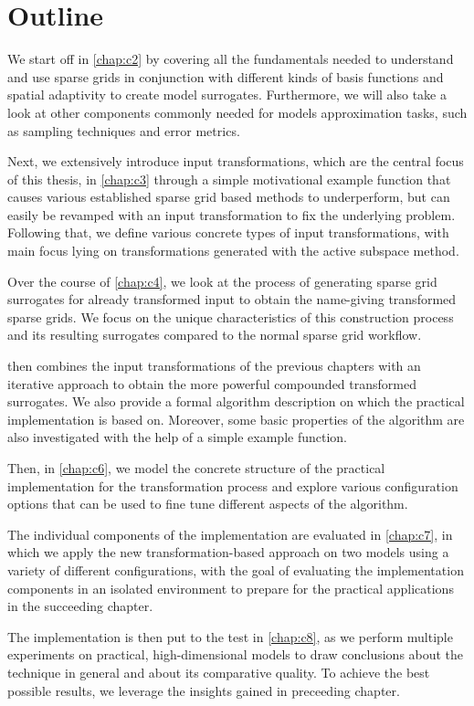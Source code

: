 \documentclass[
  a4paper,  %
  twoside,  %
  bibliography=totoc,
  headsepline,
  cleardoublepage=empty,
  parskip=half,
  draft=false
]{scrbook}
\begin{document}
\section{Outline}

We start off in \cref{chap:c2} by covering all the fundamentals needed to understand and use sparse grids in conjunction with different kinds of basis functions and spatial adaptivity to create model surrogates.
Furthermore, we will also take a look at other components commonly needed for models approximation tasks, such as sampling techniques and error metrics.

Next, we extensively introduce input transformations, which are the central focus of this thesis, in \cref{chap:c3} through a simple motivational example function that causes various established sparse grid based methods to underperform, but can easily be revamped with an input transformation to fix the underlying problem.
Following that, we define various concrete types of input transformations, with main focus lying on transformations generated with the active subspace method.

Over the course of \cref{chap:c4}, we look at the process of generating sparse grid surrogates for already transformed input to obtain the name-giving transformed sparse grids.
We focus on the unique characteristics of this construction process and its resulting surrogates compared to the normal sparse grid workflow.

 then combines the input transformations of the previous chapters with an iterative approach to obtain the more powerful compounded transformed surrogates.
We also provide a formal algorithm description on which the practical implementation is based on.
Moreover, some basic properties of the algorithm are also investigated with the help of a simple example function.

Then, in \cref{chap:c6}, we model the concrete structure of the practical implementation for the transformation process and explore various configuration options that can be used to fine tune different aspects of the algorithm.

The individual components of the implementation are evaluated in \cref{chap:c7}, in which we apply the new transformation-based approach on two models using a variety of different configurations, with the goal of evaluating the implementation components in an isolated environment to prepare for the practical applications in the succeeding chapter.

The implementation is then put to the test in \cref{chap:c8}, as we perform multiple experiments on practical, high-dimensional models to draw conclusions about the technique in general and about its comparative quality.
To achieve the best possible results, we leverage the insights gained in preceeding chapter.
\end{document}
